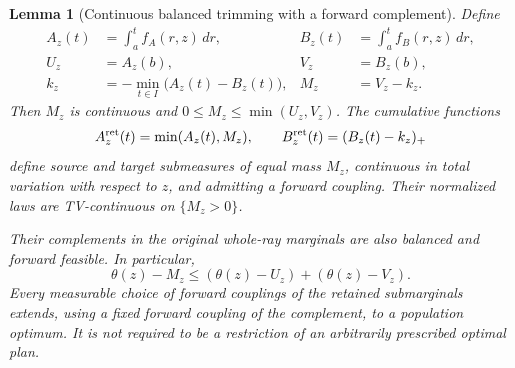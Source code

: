 \documentclass[11pt,reqno]{amsart}
\newtheorem{lemma}[theorem]{Lemma}
\theoremstyle{definition}
\theoremstyle{remark}
\numberwithin{equation}{section}
\begin{document}
\begin{lemma}[Continuous balanced trimming with a forward complement]
\label{lem:compact-conditional-trimming}
Define
\begin{align*}
 A_z(t)&=\int_a^t f_A(r,z)\,dr,&
 B_z(t)&=\int_a^t f_B(r,z)\,dr,\\
 U_z&=A_z(b),&V_z&=B_z(b),\\
 k_z&=-\min_{t\in I}\bigl(A_z(t)-B_z(t)\bigr),&
 M_z&=V_z-k_z.
\end{align*}
Then \(M_z\) is continuous and \(0\le M_z\le\min(U_z,V_z)\).
The cumulative functions
\begin{equation}
\label{eq:compact-conditional-trimmed-cdfs}
 A_z^{\rm ret}(t)=\min(A_z(t),M_z),
 \qquad
 B_z^{\rm ret}(t)=(B_z(t)-k_z)_+
\end{equation}
define source and target submeasures of equal mass \(M_z\),
continuous in total variation with respect to \(z\), and admitting
a forward coupling. Their normalized laws are TV-continuous on
\(\{M_z>0\}\).

Their complements in the original whole-ray marginals are also
balanced and forward feasible. In particular,
\begin{equation}
\label{eq:compact-conditional-trimming-loss}
 \theta(z)-M_z
       \le (\theta(z)-U_z)+(\theta(z)-V_z).
\end{equation}
Every measurable choice of forward couplings of the retained
submarginals extends, using a fixed forward coupling of the complement,
to a population optimum. It is not required to be a restriction of an
arbitrarily prescribed optimal plan.
\end{lemma}
\end{document}
